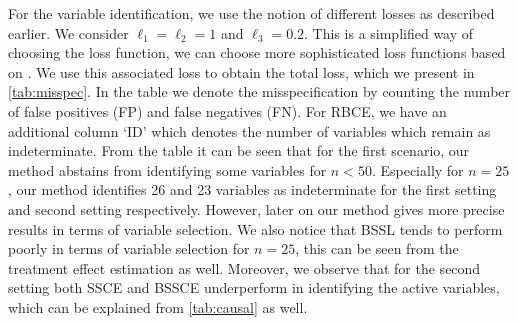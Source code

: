 \documentclass{amsart}
\begin{document}
For the variable identification, we use the notion of
different losses as described earlier. We consider
$\ell_1=\ell_2 = 1$ and $\ell_3= 0.2$. This is a
simplified way of choosing the loss function, we can choose more 
sophisticated loss functions based on \cite{ZAFFALON20121282}. We use this associated loss
to obtain the total loss, which we present in \cref{tab:misspec}.
In the table we denote the misspecification by counting the number of
false positives (FP) and false negatives (FN). For RBCE, we have an
additional column `ID' which denotes the number of variables which remain as
indeterminate.
From the table it can be seen that for the first scenario, our method
abstains from identifying some variables for 
$n <50$. Especially for $n=25$, our method identifies 26 and 23 variables as indeterminate
for the first setting and second setting respectively. However,
later on our method gives more precise results in terms of variable
selection. We also notice that BSSL tends to perform poorly
in terms of variable selection for $n=25$, this can be seen
from the treatment effect estimation as well.
Moreover, we observe that for the second setting both SSCE
and BSSCE underperform in identifying the active variables, which can 
be explained from \cref{tab:causal} as well. 
\end{document}
